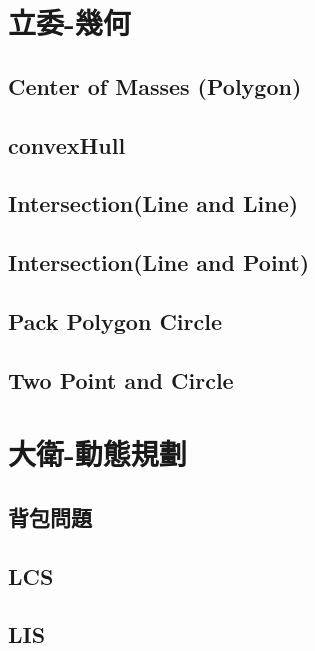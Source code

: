 \section{立委-幾何}
\subsection{Center of Masses (Polygon)}
\raggedbottom
\hrulefill
\subsection{convexHull}
\raggedbottom
\hrulefill
\subsection{Intersection(Line and Line)}
\raggedbottom
\hrulefill
\subsection{Intersection(Line and Point)}
\raggedbottom
\hrulefill
\subsection{Pack Polygon Circle}
\raggedbottom
\hrulefill
\subsection{Two Point and Circle}
\raggedbottom
\hrulefill

\section{大衛-動態規劃}
\subsection{背包問題}
\raggedbottom
\hrulefill
\subsection{LCS}
\raggedbottom
\hrulefill
\subsection{LIS}
\raggedbottom
\hrulefill
